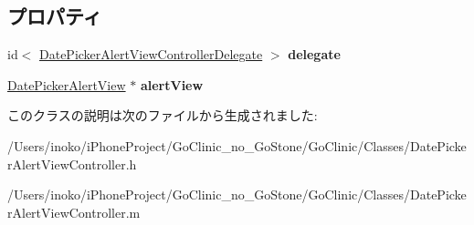 \subsection*{プロパティ}
\begin{DoxyCompactItemize}
\item 
\hypertarget{interface_date_picker_alert_view_controller_a8e2e3f09909ad7beab26a59e01bfae4f}{
id$<$ \hyperlink{protocol_date_picker_alert_view_controller_delegate-p}{DatePickerAlertViewControllerDelegate} $>$ {\bfseries delegate}}
\label{interface_date_picker_alert_view_controller_a8e2e3f09909ad7beab26a59e01bfae4f}

\item 
\hypertarget{interface_date_picker_alert_view_controller_a382f42716e884619ae1c8a70f60a98a9}{
\hyperlink{interface_date_picker_alert_view}{DatePickerAlertView} $\ast$ {\bfseries alertView}}
\label{interface_date_picker_alert_view_controller_a382f42716e884619ae1c8a70f60a98a9}

\end{DoxyCompactItemize}


このクラスの説明は次のファイルから生成されました:\begin{DoxyCompactItemize}
\item 
/Users/inoko/iPhoneProject/GoClinic\_\-no\_\-GoStone/GoClinic/Classes/DatePickerAlertViewController.h\item 
/Users/inoko/iPhoneProject/GoClinic\_\-no\_\-GoStone/GoClinic/Classes/DatePickerAlertViewController.m\end{DoxyCompactItemize}
